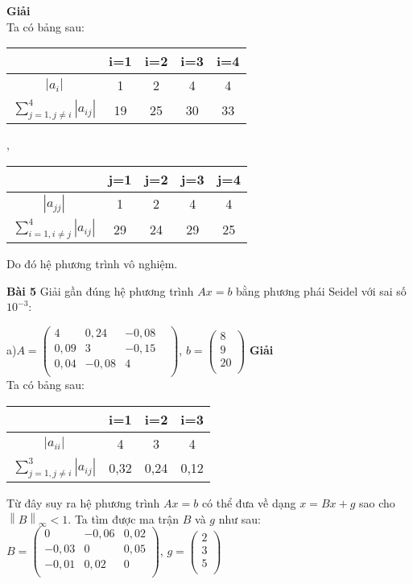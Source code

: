 \par
\textbf{Giải}\\
Ta có bảng sau:\\
\begin{center}
\begin{tabular}{|c|c|c|c|c|}\hline
&i=1&i=2&i=3&i=4\\ \hline
$\left|a_i\right|$&1&2&4&4\\ \hline
$\sum\limits_{j=1, j\neq i}^{4} \left|a_{ij}\right|$&19&25&30&33\\ \hline
\end{tabular}, \begin{tabular}{|c|c|c|c|c|}\hline
& j=1 & j=2 & j=3 & j=4 \\ \hline
$\left|a_{jj}\right|$ & 1 & 2 & 4 & 4 \\ \hline
$\sum\limits_{i=1,i\neq j}^{4}\left|a_{ij}\right|$ & 29 & 24 & 29 & 25\\ \hline
\end{tabular}
\end{center}
Do đó hệ phương trình vô nghiệm.\par

\textbf{Bài 5} Giải gần đúng hệ phương trình $Ax=b$ bằng phương phái Seidel với sai số $10^{-3}$:\par
a)$A= \begin{pmatrix}
4&0,24&-0,08&\\
0,09&3&-0,15&\\
0,04&-0,08&4&\\
\end{pmatrix}$, $b= \begin{pmatrix}
8\\
9\\
20\\
\end{pmatrix}$
\textbf{Giải}\\
Ta có bảng sau:
\begin{center} \begin{tabular}{|c|c|c|c|}\hline
&i=1&i=2&i=3\\\hline
$\left|a_{ii}\right|$&4&3&4\\\hline
$\sum\limits_{j=1,j\neq i}^{3} \left|a_{ij}\right|$&0,32&0,24&0,12\\\hline
\end{tabular}\end{center}
Từ đây suy ra hệ phương trình $Ax=b$ có thể đưa về dạng $x=Bx+g$ sao cho $\left\|B\right\|_{\infty} <1$.
Ta tìm được ma trận $B$ và $g$ như sau:\\
$B= \begin{pmatrix}
0&-0,06&0,02\\
-0,03&0&0,05\\
-0,01&0,02&0\\
\end{pmatrix}$, $g=\begin{pmatrix}
2\\
3\\
5\\
\end{pmatrix}$


